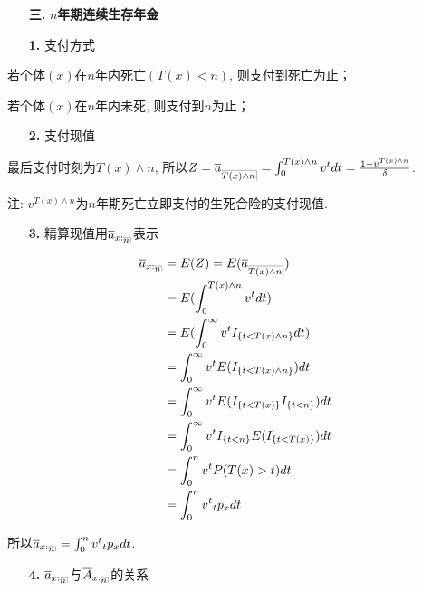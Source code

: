 \documentclass[a4paper,10pt]{ctexbook}
\makeatletter
\newcommand{\hei}{\CJKfamily{hei}}      %
\DeclareRobustCommand{\annu}[1]{_{%
    \def\arraystretch{0}%
    \setlength\arraycolsep{1pt}%
    \setlength\arrayrulewidth{.2pt}%
    \begin{array}[b]{@{}c|}\hline
        \\[\arraycolsep]%
        \scriptstyle #1%
    \end{array}%
}}
\makeatother
\begin{document}
\begin{itemize}
    \item[{\bf\hei 三.}]{\bf\hei $n$年期连续生存年金}
\end{itemize}

\begin{itemize}
    \item[{\bf\hei 1.}] 支付方式
\end{itemize}

若个体$(x)$在$n$年内死亡$(T(x)<n)$, 则支付到死亡为止；

若个体$(x)$在$n$年内未死, 则支付到$n$为止；

\begin{itemize}
    \item[{\bf\hei 2.}] 支付现值
\end{itemize}

最后支付时刻为$T(x)\wedge n$, 所以$Z = \overline{a}_{\annu{T(x)\wedge n}} = \int_0^{T(x)\wedge n} v^tdt = \frac{1-v^{T(x)\wedge n}}{\delta}$.

注: $v^{T(x)\wedge n}$为$n$年期死亡立即支付的生死合险的支付现值.
\begin{itemize}
    \item[{\bf\hei 3.}] 精算现值用$\overline{a}_{x:\annu{n}}$表示
\end{itemize}

\begin{align*}
    \overline{a}_{x:\annu{n}} & = E(Z)=E(\overline{a}_{\annu{T(x)\wedge n}})           \\
                              & = E(\int_0^{T(x)\wedge n} v^tdt)                       \\
                              & = E(\int_0^{\infty} v^tI_{\{t < T(x)\wedge n\}}dt)     \\
                              & = \int_0^{\infty} v^tE(I_{\{t < T(x)\wedge n\}})dt     \\
                              & = \int_0^{\infty} v^tE(I_{\{t< T(x)\} } I_{\{t<n\}})dt \\
                              & = \int_0^{\infty} v^tI_{\{t<n\}} E(I_{\{t< T(x)\} })dt \\
                              & = \int_0^{n} v^tP(T(x) >t )dt                          \\
                              & = \int_0^{n} v^t{}_{t}p_xdt
\end{align*}

所以$\overline{a}_{x:\annu{n}}= \int_0^{n} v^t{}_{t}p_xdt$.
\begin{itemize}
    \item[{\bf\hei 4.}] $\overline{a}_{x:\annu{n}}$与$\overline{A}_{x:\annu{n}}$的关系
\end{itemize}
\end{document}
